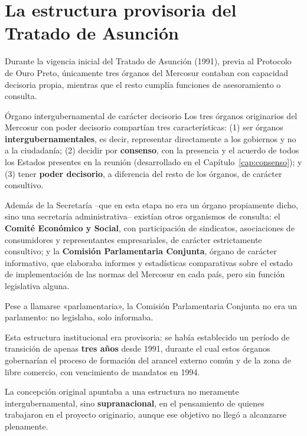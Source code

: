 \documentclass[12pt,oneside]{book}
\begin{document}
\section{La estructura provisoria del Tratado de Asunción}

Durante la vigencia inicial del Tratado de Asunción (1991), previa al Protocolo de Ouro Preto, únicamente tres órganos del Mercosur contaban con capacidad decisoria propia, mientras que el resto cumplía funciones de asesoramiento o consulta.

\begin{definicion}{Órgano intergubernamental de carácter decisorio}
Los tres órganos originarios del Mercosur con poder decisorio compartían tres características: (1) ser órganos \textbf{intergubernamentales}, es decir, representar directamente a los gobiernos y no a la ciudadanía; (2) decidir por \textbf{consenso}, con la presencia y el acuerdo de todos los Estados presentes en la reunión (desarrollado en el Capítulo~\ref{cap:consenso}); y (3) tener \textbf{poder decisorio}, a diferencia del resto de los órganos, de carácter consultivo.
\end{definicion}

Además de la Secretaría --que en esta etapa no era un órgano propiamente dicho, sino una secretaría administrativa-- existían otros organismos de consulta: el \textbf{Comité Económico y Social}, con participación de sindicatos, asociaciones de consumidores y representantes empresariales, de carácter estrictamente consultivo; y la \textbf{Comisión Parlamentaria Conjunta}, órgano de carácter informativo, que elaboraba informes y estadísticas comparativas sobre el estado de implementación de las normas del Mercosur en cada país, pero sin función legislativa alguna.

\begin{nota}
Pese a llamarse «parlamentaria», la Comisión Parlamentaria Conjunta no era un parlamento: no legislaba, solo informaba.
\end{nota}

Esta estructura institucional era provisoria: se había establecido un período de transición de apenas \textbf{tres años} desde 1991, durante el cual estos órganos gobernarían el proceso de formación del arancel externo común y de la zona de libre comercio, con vencimiento de mandatos en 1994.

\begin{importante}
La concepción original apuntaba a una estructura no meramente intergubernamental, sino \textbf{supranacional}, en el pensamiento de quienes trabajaron en el proyecto originario, aunque ese objetivo no llegó a alcanzarse plenamente.
\end{importante}
\end{document}
